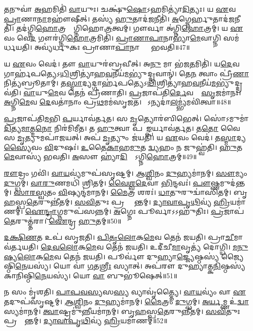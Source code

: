 \ul{𑌤}𑌨𑍁𑌵𑌾॑ \ul{𑌅}𑌹𑌮𑌿𑌤𑌿॑ \ul{𑌵𑌾}𑌯𑍁𑌃।
𑌚𑌕𑍍𑌷𑍁॑\ul{𑌷𑍋}\-𑌽𑌹𑌮𑌿𑌤𑍍𑌯𑌾॑\ul{𑌦𑌿}𑌤𑍍𑌯𑌃।
𑌯 \ul{𑌏}𑌵 \ul{𑌪𑍍𑌰𑌾}𑌣𑌾\ul{𑌨𑌾}𑌮𑌹𑍗॑𑌷𑍀𑌤𑍍।
𑌤𑌸𑍍𑌯॑ \ul{𑌹𑍁}𑌤𑌾𑌦॑\ul{𑌜}𑌨𑍀𑌤𑌿॑।
\ul{𑌅}𑌗𑍍𑌨𑍇𑌰𑍍\mbox{}\ul{𑌹𑍁}𑌤𑌾𑌦॑\ul{𑌜}𑌨𑍀𑌤𑌿॑।
𑌤𑌦॑𑌗𑍍𑌨𑌿\ul{𑌹𑍋}𑌤𑍍𑌰𑌸𑍍𑌯𑌾᳚𑌗𑍍𑌨𑌿𑌹𑍋\ul{𑌤𑍍𑌰}𑌤𑍍𑌵𑌮𑍍।
𑌗𑍗𑌰𑍍𑌵𑌾 𑌅॑𑌗𑍍𑌨𑌿\ul{𑌹𑍋}𑌤𑍍𑌰𑌮𑍍।
𑌯 \ul{𑌏}𑌵𑌂 𑌵𑍇\ul{𑌦} 𑌗𑍗𑌰॑𑌗𑍍𑌨𑌿\ul{𑌹𑍋}𑌤𑍍𑌰𑌮𑌿𑌤𑌿॑।
\ul{𑌪𑍍𑌰𑌾}\ul{𑌣𑌾}\ul{𑌪𑌾}𑌨𑌾𑌭𑍍𑌯𑌾॑\ul{𑌮𑍇}𑌵𑌾𑌗𑍍𑌨𑌿 𑌸𑌮॑𑌰𑍍𑌧𑌯𑌤𑌿।
𑌅𑌵𑍍𑌯॑𑌰𑍍𑌧𑍁𑌕𑌃 𑌪𑍍𑌰𑌾𑌣𑌾\ul{𑌪𑌾}𑌨𑌾𑌭𑍍𑌯𑌾𑌂᳚ 𑌭𑌵𑌤𑌿॥47॥

𑌯 \ul{𑌏}𑌵𑌂 𑌵𑍇𑌦॑।
𑌤𑍗 \ul{𑌵𑌾}𑌯𑍁𑌰॑𑌬𑍍𑌰𑌵𑍀𑌤𑍍।
𑌅\ul{𑌨𑍁} 𑌮𑌾 𑌭॑𑌜\ul{𑌤}𑌮𑌿𑌤𑌿॑।
𑌯\ul{𑌦𑍇}𑌵 𑌗𑌾𑌰𑍍\mbox{}𑌹॑𑌪𑌤𑍍𑌯𑍇\-𑌽\ul{𑌧𑌿}𑌶𑍍𑌰𑌿𑌤𑍍𑌯𑌾॑𑌹\ul{𑌵}𑌨𑍀𑌯॑\ul{𑌮}𑌭𑍍𑌯𑍁॑𑌦𑍍𑌦𑍍𑌰𑌵𑌾𑌨𑍍॑।
𑌤𑍇\ul{𑌨} 𑌤𑍍𑌵𑌾𑌂 𑌪𑍍𑌰𑍀॑\ul{𑌣𑌾}𑌨𑌿𑌤𑍍𑌯॑𑌬𑍍𑌰𑍂𑌤𑌾𑌮𑍍।
𑌤\ul{𑌸𑍍𑌮𑌾}𑌦𑍍𑌯𑌦𑍍𑌗𑌾𑌰𑍍\mbox{}𑌹॑𑌪𑌤𑍍𑌯𑍇\-𑌽\ul{𑌧𑌿}𑌶𑍍𑌰𑌿𑌤𑍍𑌯𑌾॑𑌹\ul{𑌵}𑌨𑍀𑌯॑\-\ul{𑌮}𑌭𑍍𑌯𑍁॑𑌦𑍍𑌦𑍍𑌰𑌵॑𑌤𑌿।
\ul{𑌵𑌾}𑌯𑍁\ul{𑌮𑍇}𑌵 𑌤𑍇𑌨॑ 𑌪𑍍𑌰𑍀𑌣𑌾𑌤𑌿।
\ul{𑌪𑍍𑌰}𑌜𑌾𑌪॑𑌤𑌿\ul{𑌰𑍍𑌦𑍇}𑌵𑌤𑌾𑌃᳚ \ul{𑌸𑍃}𑌜𑌮𑌾॑𑌨𑌃।
\ul{𑌅}𑌗𑍍𑌨𑌿\ul{𑌮𑍇}𑌵 \ul{𑌦𑍇}𑌵𑌤𑌾॑𑌨𑌾𑌂 𑌪𑍍𑌰\ul{𑌥}𑌮𑌮॑𑌸𑍃𑌜𑌤।
𑌸𑍋᳚𑌽𑌨𑍍𑌯𑌦𑌾॑\-\ul{𑌲}𑌮𑍍𑌭𑍍𑌯॑𑌮𑌵𑌿॑𑌤𑍍𑌵𑌾॥48॥

\ul{𑌪𑍍𑌰}𑌜𑌾𑌪॑𑌤𑌿\ul{𑌮}𑌭𑌿 \ul{𑌪}𑌰𑍍𑌯𑌾𑌵॑𑌰𑍍𑌤𑌤।
𑌸 \ul{𑌮𑍃}𑌤𑍍𑌯𑍋𑌰॑𑌬𑌿𑌭𑍇𑌤𑍍।
𑌸𑍋॑𑌽𑌮𑍁𑌮𑌾॑\ul{𑌦𑌿}𑌤𑍍𑌯\-\ul{𑌮𑌾}𑌤𑍍𑌮\ul{𑌨𑍋} 𑌨𑌿𑌰॑𑌮𑌿𑌮𑍀𑌤।
𑌤 \ul{𑌹𑍁}𑌤𑍍𑌵𑌾 𑌪𑌰𑌾᳚\ul{𑌙𑍍𑌪}𑌰𑍍𑌯𑌾𑌵॑𑌰𑍍𑌤𑌤।
𑌤\ul{𑌤𑍋} 𑌵𑍈 𑌸 \ul{𑌮𑍃}𑌤𑍍𑌯𑍁𑌮𑌪𑌾॑𑌜𑌯𑌤𑍍।
𑌅𑌪॑ \ul{𑌮𑍃}𑌤𑍍𑌯𑍁𑌂 𑌜॑𑌯𑌤𑌿।
𑌯 \ul{𑌏}𑌵𑌂 𑌵𑍇𑌦॑।
𑌤\ul{𑌸𑍍𑌮𑌾}𑌦𑍍𑌯\ul{𑌸𑍍𑌯𑍈}𑌵𑌂 \ul{𑌵𑌿}𑌦𑍁𑌷𑌃॑।
\ul{𑌉}𑌤𑍈\ul{𑌕𑌾}𑌹\ul{𑌮𑍁}𑌤 \ul{𑌦𑍍𑌵𑍍𑌯}𑌹𑌂 𑌨 𑌜𑍁𑌹𑍍𑌵॑𑌤𑌿।
\ul{𑌹𑍁}𑌤\ul{𑌮𑍇}𑌵𑌾𑌸𑍍𑌯॑ 𑌭𑌵𑌤𑌿।
\ul{𑌅}𑌸𑍗 𑌹𑍍𑌯𑌾॑\ul{𑌦𑌿}𑌤𑍍𑌯𑍋᳚\-𑌽𑌗𑍍𑌨𑌿\ul{𑌹𑍋}𑌤𑍍𑌰𑌮𑍍॥49॥\anuvakamend[\ul{𑌤}𑌨𑍁𑌵𑍈॑ \ul{𑌵𑌾}𑌯𑍁\ul{𑌰}𑌗𑍍𑌨𑌿𑌰𑍍𑌭॑\ul{𑌵}𑌤𑍍𑌯𑌵𑌿॑𑌤𑍍𑌵𑌾 𑌭\ul{𑌵}𑌤𑍍𑌯𑍇𑌕𑌂॑ 𑌚]

\ul{𑌰𑍗}𑌦𑍍𑌰𑌂 𑌗𑌵𑌿॑।
\ul{𑌵𑌾}\ul{𑌯}𑌵𑍍𑌯॑𑌮𑍁𑌪॑𑌸𑍃𑌷𑍍𑌟𑌮𑍍।
\ul{𑌆}\ul{𑌶𑍍𑌵𑌿}𑌨𑌂 \ul{𑌦𑍁}𑌹𑍍𑌯𑌮𑌾॑𑌨𑌮𑍍।
\ul{𑌸𑍗}𑌮𑍍𑌯𑌂 \ul{𑌦𑍁}𑌗𑍍𑌧𑌮𑍍।
\ul{𑌵𑌾}\ul{𑌰𑍁}𑌣𑌮𑌧𑌿॑ 𑌶𑍍𑌰𑌿𑌤𑌮𑍍।
\ul{𑌵𑍈}\ul{𑌶𑍍𑌵}\ul{𑌦𑍇}𑌵𑌾 \ul{𑌭𑌿}𑌨𑍍𑌦𑌵𑌃॑।
\ul{𑌪𑍗}𑌷𑍍𑌣𑌮𑍁𑌦॑𑌨𑍍𑌤𑌮𑍍।
\ul{𑌸𑌾}\ul{𑌰}\ul{𑌸𑍍𑌵}𑌤𑌂 \ul{𑌵𑌿}𑌷𑍍𑌯𑌨𑍍𑌦॑𑌮𑌾𑌨𑌮𑍍।
\ul{𑌮𑍈}𑌤𑍍𑌰 𑌶𑌰𑌃॑।
\ul{𑌧𑌾}𑌤𑍁𑌰𑍁𑌦𑍍𑌵𑌾॑𑌸𑌿𑌤𑌮𑍍।
𑌬𑍃\ul{𑌹}𑌸𑍍𑌪\ul{𑌤𑍇}𑌰𑍁𑌨𑍍𑌨𑍀॑𑌤𑌮𑍍।
\ul{𑌸}\ul{𑌵𑌿}𑌤𑍁𑌃 𑌪𑍍𑌰 𑌕𑍍𑌰𑌾᳚𑌨𑍍𑌤𑌮𑍍।
\ul{𑌦𑍍𑌯𑌾}\ul{𑌵𑌾}\ul{𑌪𑍃}\ul{𑌥𑌿}𑌵𑍍𑌯॑ \ul{𑌹𑍍𑌰𑌿}𑌯𑌮𑌾॑𑌣𑌮𑍍।
\ul{𑌐}\ul{𑌨𑍍𑌦𑍍𑌰𑌾}𑌗𑍍𑌨𑌮𑍁𑌪॑𑌸𑌨𑍍𑌨𑌮𑍍।
\ul{𑌅}𑌗𑍍𑌨𑍇𑌃 𑌪𑍂𑌰𑍍𑌵𑌾\-𑌽𑌽𑌹𑍁॑𑌤𑌿𑌃।
\ul{𑌪𑍍𑌰}𑌜𑌾𑌪॑\ul{𑌤𑍇}𑌰𑍁𑌤𑍍𑌤॑𑌰𑌾।
\ul{𑌐}𑌨𑍍𑌦𑍍𑌰 \ul{𑌹𑍁}𑌤𑌮𑍍॥50॥\anuvakamend[𑌉𑌦𑍍𑌵𑌾॑𑌸𑌿𑌤\dng{ꣳ} \ul{𑌸}𑌪𑍍𑌤 𑌚॑]

\ul{𑌦}\ul{𑌕𑍍𑌷𑌿}\ul{𑌣}𑌤 𑌉𑌪॑ 𑌸𑍃𑌜𑌤𑌿।
\ul{𑌪𑌿}\ul{𑌤𑍃}\ul{𑌲𑍋}𑌕\ul{𑌮𑍇}𑌵 𑌤𑍇𑌨॑ 𑌜𑌯𑌤𑌿।
𑌪𑍍𑌰𑌾\ul{𑌚𑍀}𑌮𑌾 𑌵॑𑌰𑍍𑌤𑌯𑌤𑌿।
\ul{𑌦𑍇}\ul{𑌵}\ul{𑌲𑍋}𑌕\ul{𑌮𑍇}𑌵 𑌤𑍇𑌨॑ 𑌜𑌯𑌤𑌿।
𑌉𑌦𑍀॑𑌚𑍀\ul{𑌮𑌾}𑌵𑍃𑌤𑍍𑌯॑ 𑌦𑍋𑌗𑍍𑌧𑌿।
\ul{𑌮}\ul{𑌨𑍁}\ul{𑌷𑍍𑌯}\ul{𑌲𑍋}𑌕\ul{𑌮𑍇}𑌵 𑌤𑍇𑌨॑ 𑌜𑌯𑌤𑌿।
𑌪𑍂𑌰𑍍𑌵𑍗॑ 𑌦𑍁𑌹𑍍𑌯𑌾\ul{𑌜𑍍𑌜𑍍𑌯𑍇}𑌷𑍍𑌠𑌸𑍍𑌯॑ 𑌜𑍍𑌯𑍈𑌷𑍍𑌠𑌿\ul{𑌨𑍇}𑌯𑌸𑍍𑌯॑।
𑌯𑍋 𑌵𑌾॑ \ul{𑌗}𑌤\ul{𑌶𑍍𑌰𑍀𑌃} 𑌸𑍍𑌯𑌾𑌤𑍍।
𑌅𑌪॑𑌰𑍗 𑌦𑍁𑌹𑍍𑌯𑌾𑌤𑍍𑌕\ul{𑌨𑌿}𑌷𑍍𑌠𑌸𑍍𑌯॑ 𑌕𑌾𑌨𑌿𑌷𑍍𑌠𑌿\ul{𑌨𑍇}𑌯𑌸𑍍𑌯॑।
𑌯𑍋 \ul{𑌵𑌾} 𑌬𑍁𑌭𑍂॑𑌷𑍇𑌤𑍍॥51॥

𑌨 𑌸𑌂 𑌮𑍃॑𑌶𑌤𑌿।
\ul{𑌪𑌾}\ul{𑌪}\ul{𑌵}\ul{𑌸𑍍𑌯}𑌸\ul{𑌸𑍍𑌯} 𑌵𑍍𑌯𑌾𑌵𑍃॑𑌤𑍍𑌤𑍍𑌯𑍈।
\ul{𑌵𑌾}\ul{𑌯}𑌵𑍍𑌯𑌂॑ 𑌵𑌾 \ul{𑌏}𑌤𑌦𑍁𑌪॑𑌸𑍃𑌷𑍍𑌟𑌮𑍍।
\ul{𑌆}\ul{𑌶𑍍𑌵𑌿}𑌨𑌂 \ul{𑌦𑍁}𑌹𑍍𑌯𑌮𑌾॑𑌨𑌮𑍍।
\ul{𑌮𑍈}𑌤𑍍𑌰𑌂 \ul{𑌦𑍁}𑌗𑍍𑌧𑌮𑍍।
\ul{𑌅}\ul{𑌰𑍍𑌯}𑌮𑍍𑌣 𑌉॑\ul{𑌦𑍍𑌵𑌾}𑌸𑍍𑌯𑌮𑌾॑𑌨𑌮𑍍।
\ul{𑌤𑍍𑌵𑌾}𑌷𑍍𑌟𑍍𑌰𑌮𑍁॑\ul{𑌨𑍍𑌨𑍀}𑌯𑌮𑌾॑𑌨𑌮𑍍।
𑌬𑍃\ul{𑌹}𑌸𑍍𑌪\ul{𑌤𑍇}𑌰𑍁𑌨𑍍𑌨𑍀॑𑌤𑌮𑍍।
\ul{𑌸}\ul{𑌵𑌿}𑌤𑍁𑌃 𑌪𑍍𑌰𑌕𑍍𑌰𑌾᳚𑌨𑍍𑌤𑌮𑍍।
\ul{𑌦𑍍𑌯𑌾}\ul{𑌵𑌾}\ul{𑌪𑍃}\ul{𑌥𑌿}𑌵𑍍𑌯॑ \ul{𑌹𑍍𑌰𑌿}𑌯𑌮𑌾॑𑌣𑌮𑍍॥52॥

